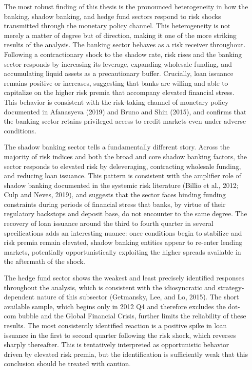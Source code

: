 \documentclass[12pt,a4paper]{report}\usepackage[a4paper, top=2.5cm, bottom=2.5cm, left=2.5cm, right=2.5cm]{geometry}
\begin{document}
The most robust finding of this thesis is the pronounced heterogeneity in how the
banking, shadow banking, and hedge fund sectors respond to risk shocks transmitted
through the monetary policy channel. This heterogeneity is not merely a matter of
degree but of direction, making it one of the more striking results of the analysis.
The banking sector behaves as a risk receiver throughout. Following a contractionary
shock to the shadow rate, risk rises and the banking sector responds by increasing its
leverage, expanding wholesale funding, and accumulating liquid assets as a precautionary
buffer. Crucially, loan issuance remains positive or increases, suggesting that banks
are willing and able to capitalize on the higher risk premia that accompany elevated
financial stress. This behavior is consistent with the risk-taking channel of monetary
policy documented in Afanasyeva (2019) and Bruno and Shin (2015), and confirms that
the banking sector retains privileged access to credit markets even under adverse
conditions.

The shadow banking sector tells a fundamentally different story. Across the majority
of risk indices and both the broad and core shadow banking factors, the sector responds
to elevated risk by deleveraging, contracting wholesale funding, and reducing loan
issuance. This pattern is consistent with the amplifier role of shadow banking
documented in the systemic risk literature (Billio et al., 2012; Culp and Neves, 2019),
and suggests that the sector faces binding funding constraints during periods of
financial stress that banks, by virtue of their regulatory backstops and deposit base,
do not encounter to the same degree. The recovery of loan issuance around the third
to fourth quarter in several specifications adds an interesting nuance: once conditions
begin to stabilize and risk premia remain elevated, shadow banking entities appear to
re-enter lending markets, potentially opportunistically exploiting the higher spreads
available in the aftermath of the shock.

The hedge fund sector shows the weakest and least precisely identified responses
throughout the analysis, which is consistent with the idiosyncratic and
strategy-dependent nature of this subsector (Getmansky, Lee, and Lo, 2015). The
short available sample, which begins only in 2012 Q4 and therefore excludes the
dot-com bubble and the Global Financial Crisis, further limits the reliability of
these results. The most consistently identified reaction is a positive spike in loan
issuance in the first to second quarter following the risk shock, which reverses
sharply thereafter. This is tentatively interpreted as opportunistic behavior driven
by elevated risk premia, but the identification is sufficiently weak that this
conclusion should be treated with caution.
\end{document}
